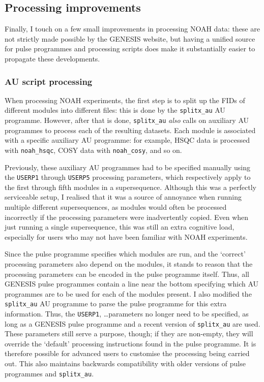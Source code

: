 \subsection{Processing improvements}
\label{subsec:noah__genesis_processing}

Finally, I touch on a few small improvements in processing NOAH data: these are not strictly made possible by the GENESIS website, but having a unified source for pulse programmes and processing scripts does make it substantially easier to propagate these developments.


\subsubsection{AU script processing}

When processing NOAH experiments, the first step is to split up the FIDs of different modules into different files: this is done by the \texttt{splitx\_au} AU programme.
However, after that is done, \texttt{splitx\_au} \textit{also} calls on auxiliary AU programmes to process each of the resulting datasets.
Each module is associated with a specific auxiliary AU programme: for example, HSQC data is processed with \texttt{noah\_hsqc}, COSY data with \texttt{noah\_cosy}, and so on.

Previously, these auxiliary AU programmes had to be specified manually using the \texttt{USERP1} through \texttt{USERP5} processing parameters, which respectively apply to the first through fifth modules in a supersequence.
Although this was a perfectly serviceable setup, I realised that it was a source of annoyance when running multiple different supersequences, as modules would often be processed incorrectly if the processing parameters were inadvertently copied.
Even when just running a single supersequence, this was still an extra cognitive load, especially for users who may not have been familiar with NOAH experiments.

Since the pulse programme specifies which modules are run, and the `correct' processing parameters also depend on the modules, it stands to reason that the processing parameters can be encoded in the pulse programme itself.
Thus, all GENESIS pulse programmes contain a line near the bottom specifying which AU programmes are to be used for each of the modules present.
I also modified the \texttt{splitx\_au} AU programme to parse the pulse programme for this extra information.
Thus, the \texttt{USERP1}, \ldots parameters no longer need to be specified, as long as a GENESIS pulse programme and a recent version of \texttt{splitx\_au} are used.
These parameters still serve a purpose, though; if they are non-empty, they will override the `default' processing instructions found in the pulse programme.
It is therefore possible for advanced users to customise the processing being carried out.
This also maintains backwards compatibility with older versions of pulse programmes and \texttt{splitx\_au}.


